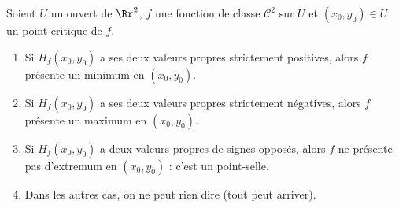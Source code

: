 \documentclass[11pt, class=report,crop=false]{standalone}
\begin{document}
\begin{theoreme}
Soient $U$ un ouvert de $\Rr^2$, $f$ une fonction de classe $\mathcal{C}^2$ sur $U$ et $(x_0,y_0)\in U$ un point critique de $f$.
\begin{enumerate}
    \item Si $H_f(x_0,y_0)$ a ses deux valeurs propres strictement positives, alors $f$ présente un minimum en $(x_0,y_0)$.
    \item Si $H_f(x_0,y_0)$ a ses deux valeurs propres strictement négatives, alors $f$ présente un maximum en $(x_0,y_0)$.
    \item Si $H_f(x_0,y_0)$ a deux valeurs propres de signes opposés, alors $f$ ne présente pas d'extremum en $(x_0,y_0)$ : c'est un point-selle.
    \item Dans les autres cas, on ne peut rien dire (tout peut arriver).
\end{enumerate}
\end{theoreme}
\end{document}
